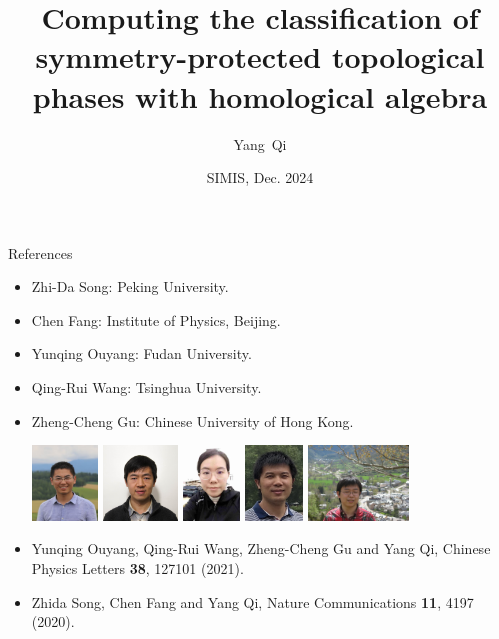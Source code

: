 \documentclass[xcolor=table, aspectratio=169,ignorenonframetext]{beamer}
\title %
{Computing the classification of symmetry-protected topological phases with homological algebra}
\author[Y Qi] %
{Yang~Qi}
\institute[Fudan] %
{
Department of Physics, Fudan University.
}
\date{SIMIS, Dec. 2024}
\begin{document}
\begin{frame}
  \titlepage
\end{frame}

\begin{frame}{References}
\begin{itemize}
\item Zhi-Da Song: Peking University.
\item Chen Fang: Institute of Physics, Beijing.
\item Yunqing Ouyang: Fudan University.
\item Qing-Rui Wang: Tsinghua University.
\item Zheng-Cheng Gu: Chinese University of Hong Kong.
\begin{center}
	\includegraphics[height=2cm]{../people/zhidasong}
	\includegraphics[height=2cm]{../people/chenfang}
        \includegraphics[height=2cm]{../people/yunqing}
        \includegraphics[height=2cm]{../people/qingrui}
        \includegraphics[height=2cm]{../people/zhengcheng}
\end{center}
\item Yunqing Ouyang, Qing-Rui Wang, Zheng-Cheng Gu and Yang Qi, Chinese Physics Letters \textbf{38}, 127101 (2021).
\item Zhida Song, Chen Fang and Yang Qi, Nature Communications \textbf{11}, 4197 (2020).
\end{itemize}
\end{frame}
\end{document}
